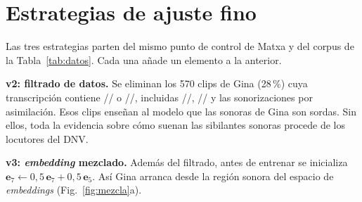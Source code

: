 \documentclass[conference]{IEEEtran}
\newcommand{\fz}{\textipa{z}}
\newcommand{\fdz}{\textipa{dz}}
\newcommand{\fZ}{\textipa{Z}}
\newcommand{\fdZ}{\textipa{dZ}}
\begin{document}
\section{Estrategias de ajuste fino}

Las tres estrategias parten del mismo punto de control de Matxa y del corpus de la Tabla~\ref{tab:datos}. Cada una añade un elemento a la anterior.

\textbf{v2: filtrado de datos.} Se eliminan los 570 clips de Gina (28\,\%) cuya transcripción contiene /\fz/ o /\fZ/, incluidas /\fdz/, /\fdZ/ y las sonorizaciones por asimilación. Esos clips enseñan al modelo que las sonoras de Gina son sordas. Sin ellos, toda la evidencia sobre cómo suenan las sibilantes sonoras procede de los locutores del DNV.

\textbf{v3: \textit{embedding} mezclado.} Además del filtrado, antes de entrenar se inicializa $\mathbf{e}_7 \leftarrow 0{,}5\,\mathbf{e}_7 + 0{,}5\,\mathbf{e}_5$. Así Gina arranca desde la región sonora del espacio de \textit{embeddings} (Fig.~\ref{fig:mezcla}a).
\end{document}
